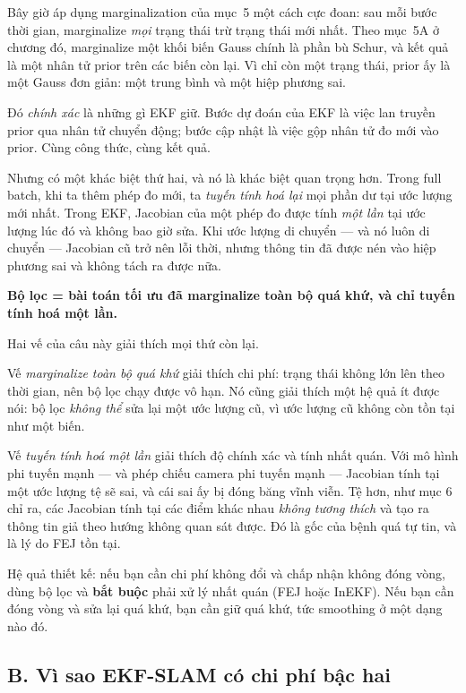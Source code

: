 \documentclass[../../vslam.tex]{subfiles}
\begin{document}
Bây giờ áp dụng marginalization của  mục~5 một cách cực đoan: sau mỗi bước thời gian, marginalize \emph{mọi} trạng thái trừ trạng thái mới nhất. Theo mục~5A ở chương đó, marginalize một khối biến Gauss chính là phần bù Schur, và kết quả là một nhân tử prior trên các biến còn lại. Vì chỉ còn một trạng thái, prior ấy là một Gauss đơn giản: một trung bình và một hiệp phương sai.

Đó \emph{chính xác} là những gì EKF giữ. Bước dự đoán của EKF là việc lan truyền prior qua nhân tử chuyển động; bước cập nhật là việc gộp nhân tử đo mới vào prior. Cùng công thức, cùng kết quả.

Nhưng có một khác biệt thứ hai, và nó là khác biệt quan trọng hơn. Trong full batch, khi ta thêm phép đo mới, ta \emph{tuyến tính hoá lại} mọi phần dư tại ước lượng mới nhất. Trong EKF, Jacobian của một phép đo được tính \emph{một lần} tại ước lượng lúc đó và không bao giờ sửa. Khi ước lượng di chuyển --- và nó luôn di chuyển --- Jacobian cũ trở nên lỗi thời, nhưng thông tin đã được nén vào hiệp phương sai và không tách ra được nữa.

\begin{cannho}
\textbf{Bộ lọc = bài toán tối ưu đã marginalize toàn bộ quá khứ, và chỉ tuyến tính hoá một lần.}

Hai vế của câu này giải thích mọi thứ còn lại.

Vế \emph{marginalize toàn bộ quá khứ} giải thích chi phí: trạng thái không lớn lên theo thời gian, nên bộ lọc chạy được vô hạn. Nó cũng giải thích một hệ quả ít được nói: bộ lọc \emph{không thể} sửa lại một ước lượng cũ, vì ước lượng cũ không còn tồn tại như một biến.

Vế \emph{tuyến tính hoá một lần} giải thích độ chính xác và tính nhất quán. Với mô hình phi tuyến mạnh --- và phép chiếu camera phi tuyến mạnh --- Jacobian tính tại một ước lượng tệ sẽ sai, và cái sai ấy bị đóng băng vĩnh viễn. Tệ hơn, như  mục 6 chỉ ra, các Jacobian tính tại các điểm khác nhau \emph{không tương thích} và tạo ra thông tin giả theo hướng không quan sát được. Đó là gốc của bệnh quá tự tin, và là lý do FEJ tồn tại.

Hệ quả thiết kế: nếu bạn cần chi phí không đổi và chấp nhận không đóng vòng, dùng bộ lọc và \textbf{bắt buộc} phải xử lý nhất quán (FEJ hoặc InEKF). Nếu bạn cần đóng vòng và sửa lại quá khứ, bạn cần giữ quá khứ, tức smoothing ở một dạng nào đó.
\end{cannho}

\subsection{B. Vì sao EKF-SLAM có chi phí bậc hai}
\end{document}
